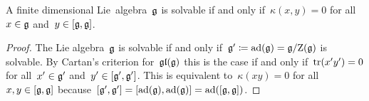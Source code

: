 \begin{theorem}
  A finite dimensional Lie~algebra~$\mathfrak{g}$ is solvable if and only if~$\kappa(x,y) = 0$ for all~$x \in \mathfrak{g}$ and~$y \in [\mathfrak{g}, \mathfrak{g}]$.
\end{theorem}


\begin{proof}
  The Lie algebra~$\mathfrak{g}$ is solvable if and only if~$\mathfrak{g}' \coloneqq \operatorname{ad}(\mathfrak{g}) = \mathfrak{g}/{\operatorname{Z}(\mathfrak{g})}$ is solvable.
  By Cartan’s criterion for~$\mathfrak{gl}(\mathfrak{g})$ this is the case if and only if~$\operatorname{tr}(x' y') = 0$ for all~$x' \in \mathfrak{g}'$ and~$y' \in [\mathfrak{g}', \mathfrak{g}']$.
  This is equivalent to~$\kappa(xy) = 0$ for all~$x, y \in [\mathfrak{g}, \mathfrak{g}]$ because~$[\mathfrak{g}', \mathfrak{g}'] = [\operatorname{ad}(\mathfrak{g}), \operatorname{ad}(\mathfrak{g})] = \operatorname{ad}([\mathfrak{g}, \mathfrak{g}])$.
\end{proof}




